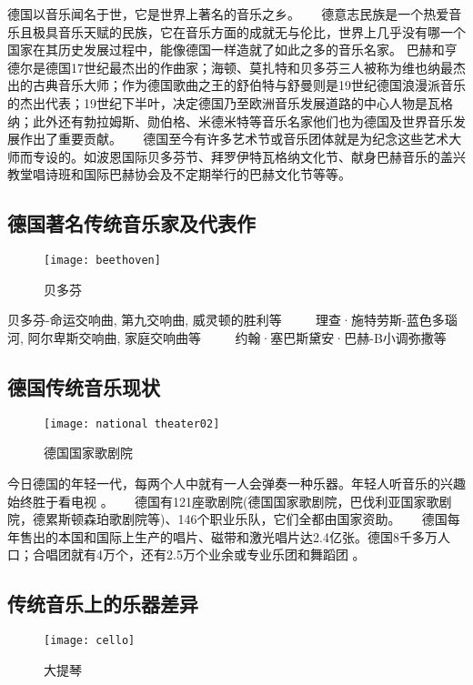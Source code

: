     德国以音乐闻名于世，它是世界上著名的音乐之乡。 
    
    德意志民族是一个热爱音乐且极具音乐天赋的民族，它在音乐方面的成就无与伦比，世界上几乎没有哪一个国家在其历史发展过程中，能像德国一样造就了如此之多的音乐名家。 巴赫和亨德尔是德国17世纪最杰出的作曲家；海顿、莫扎特和贝多芬三人被称为维也纳最杰出的古典音乐大师；作为德国歌曲之王的舒伯特与舒曼则是19世纪德国浪漫派音乐的杰出代表；19世纪下半叶，决定德国乃至欧洲音乐发展道路的中心人物是瓦格纳；此外还有勃拉姆斯、勋伯格、米德米特等音乐名家他们也为德国及世界音乐发展作出了重要贡献。 
   
    德国至今有许多艺术节或音乐团体就是为纪念这些艺术大师而专设的。如波恩国际贝多芬节、拜罗伊特瓦格纳文化节、献身巴赫音乐的盖兴教堂唱诗班和国际巴赫协会及不定期举行的巴赫文化节等等。 

\subsection{德国著名传统音乐家及代表作}

\begin{figure}[htb]
    \centering
    \texttt{[image: beethoven]}
    \caption{贝多芬}
\end{figure}

    贝多芬-命运交响曲, 第九交响曲, 威灵顿的胜利等 
   
    理查·施特劳斯-蓝色多瑙河, 阿尔卑斯交响曲, 家庭交响曲等 
   
    约翰·塞巴斯黛安·巴赫-B小调弥撒等 

\subsection{德国传统音乐现状}
\begin{figure}[htb]
    \centering
    \texttt{[image: national theater02]}
    \caption{德国国家歌剧院}
\end{figure}

    今日德国的年轻一代，每两个人中就有一人会弹奏一种乐器。年轻人听音乐的兴趣始终胜于看电视 。 
    
    德国有121座歌剧院(德国国家歌剧院，巴伐利亚国家歌剧院，德累斯顿森珀歌剧院等)、146个职业乐队，它们全都由国家资助。 
  
    德国每年售出的本国和国际上生产的唱片、磁带和激光唱片达2.4亿张。德国8千多万人口；合唱团就有4万个，还有2.5万个业余或专业乐团和舞蹈团 。 

\subsection{传统音乐上的乐器差异}
\begin{figure}[htb]
    \centering
    \texttt{[image: cello]}
    \caption{大提琴}
\end{figure}

